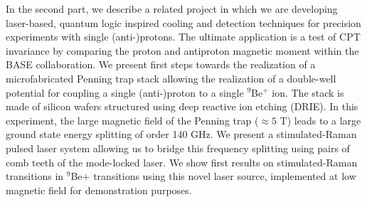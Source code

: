In the second part, we describe a related project in which we are developing laser-based, quantum logic inspired cooling and detection techniques for precision experiments with single (anti-)protons. The ultimate application is a test of CPT invariance by comparing the proton and antiproton magnetic moment within the BASE collaboration. We present first steps towards the realization of a microfabricated Penning trap stack allowing the realization of a double-well potential for coupling a single (anti-)proton to a single $^9$Be$^+$ ion. The stack is made of silicon wafers structured using deep reactive ion etching (DRIE). In this experiment, the large magnetic field of the Penning trap ($\approx 5$ T) leads to a large ground state energy splitting of order 140 GHz. We present a stimulated-Raman pulsed laser system allowing us to bridge this frequency splitting using pairs of comb teeth of the mode-locked laser. We show first results on stimulated-Raman transitions in $^9$Be$ +$ transitions using this novel laser source, implemented at low magnetic field for demonstration purposes.

%
%



\vspace{\baselineskip} 